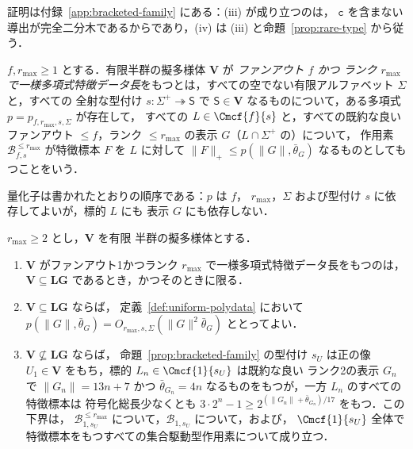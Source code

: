 証明は付録~\ref{app:bracketed-family} にある：(iii) が成り立つのは，
$\mathtt c$ を含まない導出が完全二分木であるからであり，(iv) は
(iii) と命題~\ref{prop:rare-type} から従う．


\begin{definition}[一様多項式特徴データ長]
\label{def:uniform-polydata}
$f,r_{\max}\ge1$ とする．有限半群の擬多様体 $\mathbf V$ が
\emph{ファンアウト $f$ かつ
ランク $r_{\max}$ で一様多項式特徴データ長}をもつとは，すべての空でない有限アルファベット $\Sigma$ と，すべての
全射な型付け $s:\Sigma^+\twoheadrightarrow\mathsf S$ で
$\mathsf S\in\mathbf V$ なるものについて，ある多項式 $p=p_{f,r_{\max},s,\Sigma}$ が存在して，
すべての $L\in\Cmcf{f}{s}$ と，すべての既約な良い
ファンアウト $\le f$，ランク $\le r_{\max}$ の表示 $G$（$L\cap\Sigma^+$ の）について，
作用素 $\mathcal B^{\le r_{\max}}_{f,s}$ が特徴標本
$F$ を $L$ に対して $\|F\|_+\le p(\|G\|,\bar\theta_G)$ なるものとしてもつことをいう．
\end{definition}

量化子は書かれたとおりの順序である：$p$ は $f$，
$r_{\max}$，$\Sigma$ および型付け $s$ に依存してよいが，標的 $L$ にも
表示 $G$ にも依存しない．

\begin{theorem}
\label{thm:fanout-one-data}
$r_{\max}\ge2$ とし，$\mathbf V$ を有限
半群の擬多様体とする．
\begin{enumerate}[label=\textup{(\roman*)},leftmargin=*]
\item $\mathbf V$ がファンアウト1かつランク $r_{\max}$ で一様多項式特徴データ長をもつのは，
$\mathbf V\subseteq\mathbf{LG}$ であるとき，かつそのときに限る．
\item $\mathbf V\subseteq\mathbf{LG}$ ならば，
定義~\ref{def:uniform-polydata} において
$p(\|G\|,\bar\theta_G)=O_{r_{\max},s,\Sigma}(\|G\|^2\bar\theta_G)$ ととってよい．
\item $\mathbf V\not\subseteq\mathbf{LG}$ ならば，
命題~\ref{prop:bracketed-family} の型付け $s_U$ は正の像
$U_1\in\mathbf V$ をもち，標的 $L_n\in\Cmcf{1}{s_U}$ は既約な良い
ランク2の表示 $G_n$ で $\|G_n\|=13n+7$ かつ
$\bar\theta_{G_n}=4n$ なるものをもつが，一方 $L_n$ のすべての特徴標本は
符号化総長少なくとも $3\cdot2^n-1\ge2^{(\|G_n\|+\bar\theta_{G_n})/17}$ をもつ．この下界は，
$\mathcal B^{\le r_{\max}}_{1,s_U}$ について，$\mathcal B_{1,s_U}$ について，および，
$\Cmcf{1}{s_U}$ 全体で特徴標本をもつすべての集合駆動型作用素について成り立つ．
\end{enumerate}
\end{theorem}

